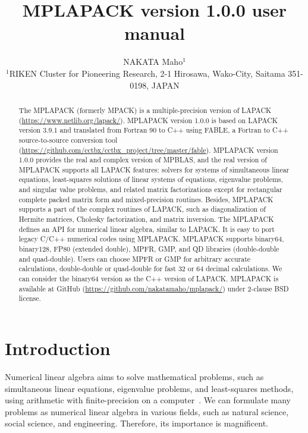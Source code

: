 \documentclass[12pt]{article}
\begin{document}
  
  \title{\sf MPLAPACK version 1.0.0 user manual}
  \author{NAKATA Maho$^1$\\
  \normalsize
  $^1$RIKEN Cluster for Pioneering Research, 2-1 Hirosawa, Wako-City, Saitama 351-0198, JAPAN}

\date{}

\maketitle

\begin{abstract}
The MPLAPACK (formerly MPACK) is a multiple-precision version of LAPACK (\url{https://www.netlib.org/lapack/}).
MPLAPACK version 1.0.0 is based on LAPACK version 3.9.1 and translated from Fortran 90 to C++ using FABLE, a Fortran to C++ source-to-source conversion tool (\url{https://github.com/cctbx/cctbx\_project/tree/master/fable}). 
MPLAPACK version 1.0.0 provides the real and complex version of MPBLAS, and the real version of MPLAPACK supports all LAPACK features: solvers for systems of simultaneous linear equations, least-squares solutions of linear systems of equations, eigenvalue problems, and singular value problems, and related matrix factorizations except for rectangular complete packed matrix form and mixed-precision routines. Besides, MPLAPACK supports a part of the complex routines of LAPACK, such as diagonalization of Hermite matrices, Cholesky factorization, and matrix inversion. The MPLAPACK defines an API for numerical linear algebra, similar to LAPACK. It is easy to port legacy C/C++ numerical codes using MPLAPACK. MPLAPACK supports binary64, binary128, FP80 (extended double), MPFR, GMP, and QD libraries (double-double and quad-double). Users can choose MPFR or GMP for arbitrary accurate calculations, double-double or quad-double for fast 32 or 64 decimal calculations. We can consider the binary64 version as the C++ version of LAPACK. MPLAPACK is available at GitHub (\url{https://github.com/nakatamaho/mplapack/}) under 2-clause BSD license.
\end{abstract}

\section{Introduction}

Numerical linear algebra aims to solve mathematical problems, such as simultaneous linear equations, eigenvalue problems, and least-squares methods, using arithmetic with finite-precision on a computer~\cite{GoluVanl96}. We can formulate many problems as numerical linear algebra in various fields, such as natural science, social science, and engineering. Therefore, its importance is magnificent. 
\end{document}
